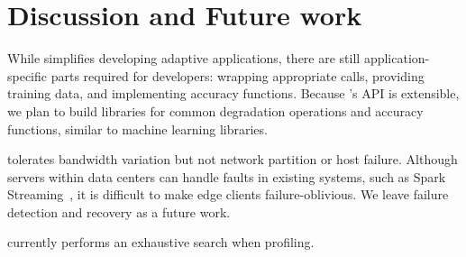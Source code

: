 \section{Discussion and Future work}
\label{sec:discussion}

 While \sysname{} simplifies developing
adaptive applications, there are still application-specific parts required for
developers: wrapping appropriate \maybe{} calls, providing training data, and
implementing accuracy functions. Because \sysname{}'s API is extensible, we plan
to build libraries for common degradation operations and accuracy functions,
similar to machine learning libraries.

 \sysname{} tolerates bandwidth variation
but not network partition or host failure. Although servers within data centers
can handle faults in existing systems, such as Spark
Streaming~\cite{zaharia2013discretized}, it is difficult to make edge clients
failure-oblivious.  We leave failure detection and recovery as a future work.

 \sysname{} currently performs an exhaustive search when
profiling. 



